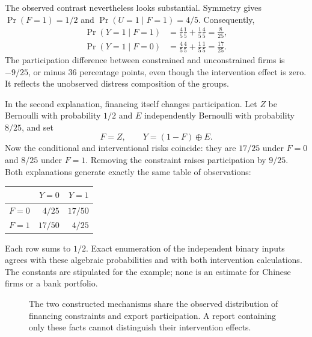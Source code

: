 The observed contrast nevertheless looks substantial. Symmetry gives
$\Pr(F=1)=1/2$ and $\Pr(U=1\mid F=1)=4/5$. Consequently,
\begin{align}
 \Pr(Y=1\mid F=1)
 &=\frac45\frac15+\frac15\frac45=\frac8{25},\\
 \Pr(Y=1\mid F=0)
 &=\frac45\frac45+\frac15\frac15=\frac{17}{25}.
\end{align}
The participation difference between constrained and unconstrained firms is
$-9/25$, or minus 36 percentage points, even though the intervention effect
is zero. It reflects the unobserved distress composition of the groups.

In the second explanation, financing itself changes participation. Let
$Z$ be Bernoulli with probability $1/2$ and $E$ independently Bernoulli with
probability $8/25$, and set
\begin{equation}
 F=Z,\qquad Y=(1-F)\mathbin{\oplus}E.
 \label{closure30:causal}
\end{equation}
Now the conditional and interventional risks coincide: they are $17/25$
under $F=0$ and $8/25$ under $F=1$. Removing the constraint raises participation
by $9/25$. Both explanations generate exactly the same table of observations:
\begin{center}
\begin{tabular}{crr}
\toprule
 & $Y=0$ & $Y=1$\\
\midrule
$F=0$ & $4/25$ & $17/50$\\
$F=1$ & $17/50$ & $4/25$\\
\bottomrule
\end{tabular}
\end{center}
Each row sums to $1/2$. Exact enumeration of the independent binary inputs
agrees with these algebraic probabilities and with both intervention
calculations. The constants are stipulated for the example; none is an
estimate for Chinese firms or a bank portfolio. \citep{rel18witness}

\begin{figure}[htbp]
\centering
{}
\caption{The two constructed mechanisms share the observed distribution
of financing constraints and export participation. A report containing only
these facts cannot distinguish their intervention effects.}
\label{closure30:twoworlds}
\end{figure}

